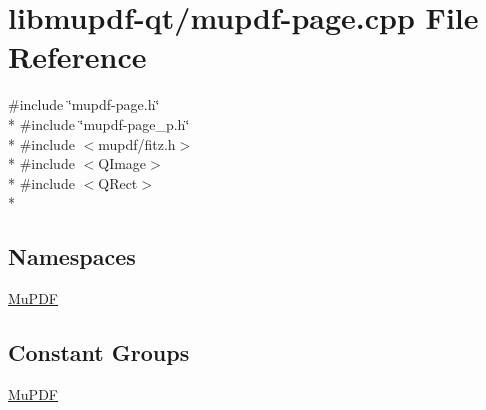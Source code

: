 \hypertarget{mupdf-page_8cpp}{\section{libmupdf-\/qt/mupdf-\/page.cpp File Reference}
\label{mupdf-page_8cpp}
}
{\ttfamily \#include \char`\"{}mupdf-\/page.\-h\char`\"{}}\\*
{\ttfamily \#include \char`\"{}mupdf-\/page\-\_\-p.\-h\char`\"{}}\\*
{\ttfamily \#include $<$mupdf/fitz.\-h$>$}\\*
{\ttfamily \#include $<$Q\-Image$>$}\\*
{\ttfamily \#include $<$Q\-Rect$>$}\\*
\subsection*{Namespaces}
\begin{DoxyCompactItemize}
\item 
\hyperlink{namespace_mu_p_d_f}{Mu\-P\-D\-F}
\end{DoxyCompactItemize}
\subsection*{Constant Groups}
\begin{DoxyCompactItemize}
\item 
\hyperlink{namespace_mu_p_d_f}{Mu\-P\-D\-F}
\end{DoxyCompactItemize}
